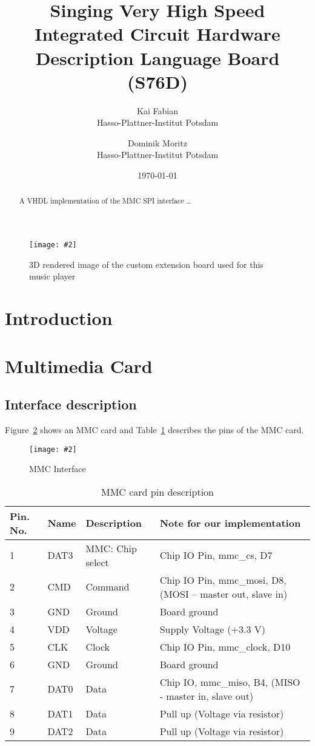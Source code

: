 \documentclass[12pt, a4paper]{article}
\title{Singing Very High Speed Integrated Circuit Hardware Description Language Board (S76D)}
\author{
        Kai Fabian \\
        Hasso-Plattner-Institut Potsdam\\
            \and
        Dominik Moritz \\
        Hasso-Plattner-Institut Potsdam\\
}
\date{\today}
\newcommand{\image}[5]{
	\begin{figure}[#4]               %
		\centering                     %
		\texttt{[image: \#2]} %
		\caption{#3}                   %
		\label{fig:#5}                 %
	\end{figure}                     %
}
\begin{document}
\maketitle

\image{0.7\textwidth}{render.png}{3D rendered image of the custom extension board used for this music player}{ht}{render}

\begin{abstract}
A VHDL implementation of the MMC SPI interface \ldots
\end{abstract}

\tableofcontents

\section{Introduction}

\section{Multimedia Card}

\subsection{Interface description}

Figure~\ref{fig:interface} shows an MMC card and Table~\ref{tab:interface} describes the pins of the MMC card.

\image{0.3\textwidth}{../mmc_pins.png}{MMC Interface}{h}{interface}

\begin{table}[hH]
    \begin{tabular}{|l|l|l|p{8cm}|}
    \hline
Pin. No.   & Name    & Description	    & Note for our implementation \\ \hline
1	       & DAT3	 & MMC: Chip select & Chip IO Pin, mmc\_cs, D7 \\
2	       & CMD	 & Command 	        & Chip IO Pin,  mmc\_mosi, D8, (MOSI – master out, slave in) \\
3	       & GND	 & Ground	        & Board ground \\
4	       & VDD	 & Voltage	        & Supply Voltage (+3.3 V) \\
5	       & CLK	 & Clock	        & Chip IO Pin,  mmc\_clock, D10 \\
6	       & GND	 & Ground	        & Board ground \\
7	       & DAT0	 & Data	            & Chip IO,  mmc\_miso, B4, (MISO - master in, slave out) \\
8	       & DAT1	 & Data	            & Pull up (Voltage via resistor) \\
9	       & DAT2	 & Data	            & Pull up (Voltage via resistor) \\
	\hline
    \end{tabular}
    \caption{MMC card pin description}
    \label{tab:interface}
\end{table}
\end{document}
